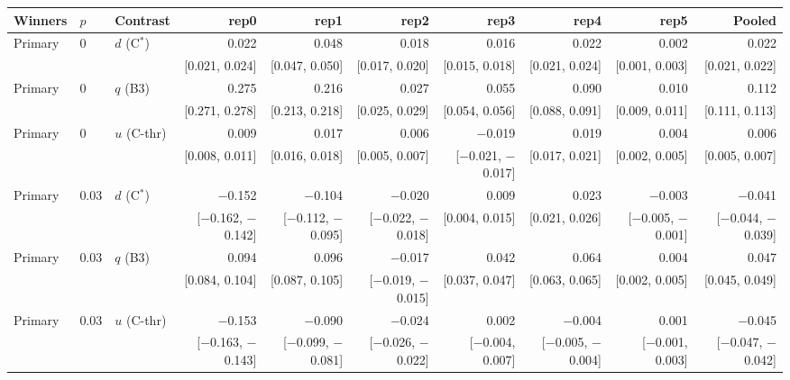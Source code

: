 \begin{tabular}{lllrrrrrrr}
\toprule
Winners & $p$ & Contrast & rep0 & rep1 & rep2 & rep3 & rep4 & rep5 & Pooled \\
\midrule
Primary & 0 & $d$ (C$^*$) & 0.022 & 0.048 & 0.018 & 0.016 & 0.022 & 0.002 & 0.022 \\
 &  &  & {\scriptsize [0.021, 0.024]} & {\scriptsize [0.047, 0.050]} & {\scriptsize [0.017, 0.020]} & {\scriptsize [0.015, 0.018]} & {\scriptsize [0.021, 0.024]} & {\scriptsize [0.001, 0.003]} & {\scriptsize [0.021, 0.022]} \\
Primary & 0 & $q$ (B3) & 0.275 & 0.216 & 0.027 & 0.055 & 0.090 & 0.010 & 0.112 \\
 &  &  & {\scriptsize [0.271, 0.278]} & {\scriptsize [0.213, 0.218]} & {\scriptsize [0.025, 0.029]} & {\scriptsize [0.054, 0.056]} & {\scriptsize [0.088, 0.091]} & {\scriptsize [0.009, 0.011]} & {\scriptsize [0.111, 0.113]} \\
Primary & 0 & $u$ (C-thr) & 0.009 & 0.017 & 0.006 & $-$0.019 & 0.019 & 0.004 & 0.006 \\
 &  &  & {\scriptsize [0.008, 0.011]} & {\scriptsize [0.016, 0.018]} & {\scriptsize [0.005, 0.007]} & {\scriptsize [$-$0.021, $-$0.017]} & {\scriptsize [0.017, 0.021]} & {\scriptsize [0.002, 0.005]} & {\scriptsize [0.005, 0.007]} \\
Primary & 0.03 & $d$ (C$^*$) & $-$0.152 & $-$0.104 & $-$0.020 & 0.009 & 0.023 & $-$0.003 & $-$0.041 \\
 &  &  & {\scriptsize [$-$0.162, $-$0.142]} & {\scriptsize [$-$0.112, $-$0.095]} & {\scriptsize [$-$0.022, $-$0.018]} & {\scriptsize [0.004, 0.015]} & {\scriptsize [0.021, 0.026]} & {\scriptsize [$-$0.005, $-$0.001]} & {\scriptsize [$-$0.044, $-$0.039]} \\
Primary & 0.03 & $q$ (B3) & 0.094 & 0.096 & $-$0.017 & 0.042 & 0.064 & 0.004 & 0.047 \\
 &  &  & {\scriptsize [0.084, 0.104]} & {\scriptsize [0.087, 0.105]} & {\scriptsize [$-$0.019, $-$0.015]} & {\scriptsize [0.037, 0.047]} & {\scriptsize [0.063, 0.065]} & {\scriptsize [0.002, 0.005]} & {\scriptsize [0.045, 0.049]} \\
Primary & 0.03 & $u$ (C-thr) & $-$0.153 & $-$0.090 & $-$0.024 & 0.002 & $-$0.004 & 0.001 & $-$0.045 \\
 &  &  & {\scriptsize [$-$0.163, $-$0.143]} & {\scriptsize [$-$0.099, $-$0.081]} & {\scriptsize [$-$0.026, $-$0.022]} & {\scriptsize [$-$0.004, 0.007]} & {\scriptsize [$-$0.005, $-$0.004]} & {\scriptsize [$-$0.001, 0.003]} & {\scriptsize [$-$0.047, $-$0.042]} \\

\end{tabular}

